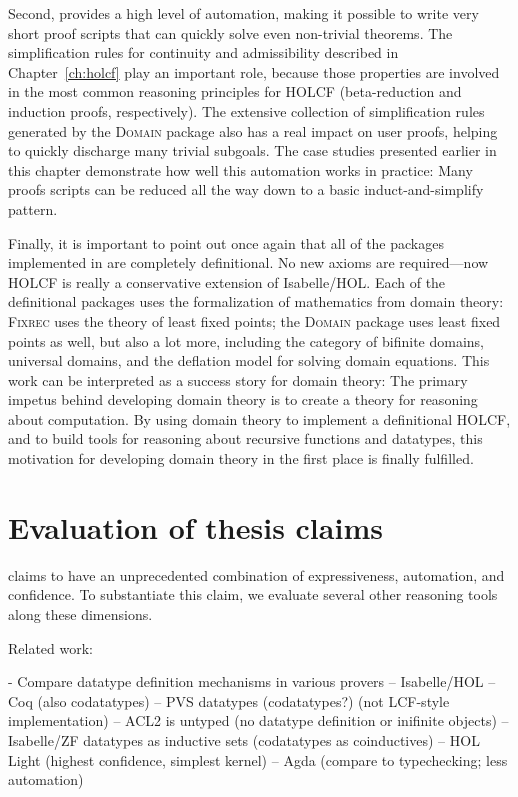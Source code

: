 Second,  provides a high level of automation, making it possible to write very short proof scripts that can quickly solve even non-trivial theorems. The simplification rules for continuity and admissibility described in Chapter~\ref{ch:holcf} play an important role, because those properties are involved in the most common reasoning principles for HOLCF (beta-reduction and induction proofs, respectively). The extensive collection of simplification rules generated by the \textsc{Domain} package also has a real impact on user proofs, helping to quickly discharge many trivial subgoals. The case studies presented earlier in this chapter demonstrate how well this automation works in practice: Many proofs scripts can be reduced all the way down to a basic induct-and-simplify pattern.

Finally, it is important to point out once again that all of the packages implemented in  are completely definitional. No new axioms are required---now HOLCF is really a conservative extension of Isabelle/HOL. Each of the definitional packages uses the formalization of mathematics from domain theory: \textsc{Fixrec} uses the theory of least fixed points; the \textsc{Domain} package uses least fixed points as well, but also a lot more, including the category of bifinite domains, universal domains, and the deflation model for solving domain equations. This work can be interpreted as a success story for domain theory: The primary impetus behind developing domain theory is to create a theory for reasoning about computation. By using domain theory to implement a definitional HOLCF, and to build tools for reasoning about recursive functions and datatypes, this motivation for developing domain theory in the first place is finally fulfilled.


\section{Evaluation of thesis claims}

 claims to have an unprecedented combination of expressiveness, automation, and confidence. To substantiate this claim, we evaluate several other reasoning tools along these dimensions.

Related work:

- Compare datatype definition mechanisms in various provers
-- Isabelle/HOL
-- Coq (also codatatypes)
-- PVS datatypes (codatatypes?)  (not LCF-style implementation)
-- ACL2 is untyped (no datatype definition or inifinite objects)
-- Isabelle/ZF datatypes as inductive sets (codatatypes as coinductives)
-- HOL Light (highest confidence, simplest kernel)
-- Agda (compare to typechecking; less automation)

